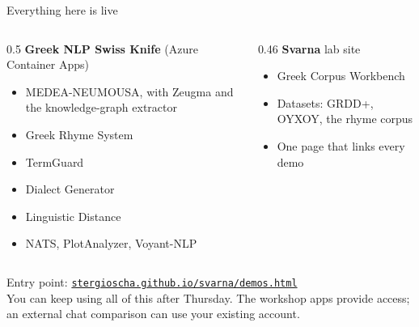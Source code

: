 \documentclass[aspectratio=169, 10pt]{beamer}
\begin{document}
\begin{frame}{Everything here is live}
  \begin{columns}[T]
    \begin{column}{0.5\textwidth}
      \textbf{Greek NLP Swiss Knife} (Azure Container Apps)
      \begin{itemize}
        \item MEDEA-NEUMOUSA, with Zeugma and the knowledge-graph extractor
        \item Greek Rhyme System
        \item TermGuard
        \item Dialect Generator
        \item Linguistic Distance
        \item NATS, PlotAnalyzer, Voyant-NLP
      \end{itemize}
    \end{column}
    \begin{column}{0.46\textwidth}
      \textbf{Svarna} lab site
      \begin{itemize}
        \item Greek Corpus Workbench
        \item Datasets: GRDD+, OYXOY, the rhyme corpus
        \item One page that links every demo
      \end{itemize}
    \end{column}
  \end{columns}
  \vspace{0.8em}
  \centering
  Entry point: \href{https://stergioscha.github.io/svarna/demos.html}{\nolinkurl{stergioscha.github.io/svarna/demos.html}}\\[4pt]
  You can keep using all of this after Thursday. The workshop apps provide access; an external chat comparison can use your existing account.
\end{frame}
\end{document}
